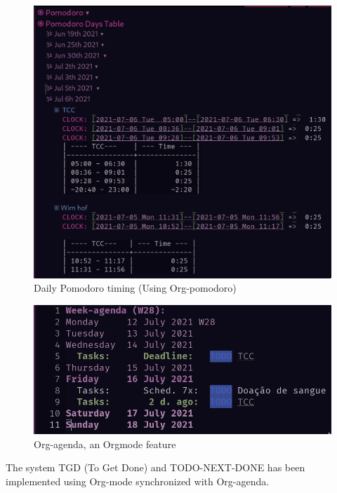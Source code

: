\documentclass[
12pt,				%
openright,			%
oneside,			%
a4paper,			%
brazil,				%
english,			%
]{abntex2}
\begin{document}

\begin{figure}[ht]
  \centering
  \caption{\label{fig:org-pomodoro} Daily Pomodoro timing (Using Org-pomodoro)}
  \includegraphics[width=0.4\linewidth]{Imagens/daily-pomodoro.png}
\end{figure}

\begin{figure}[ht]
  \centering
  \caption{\label{fig:org-agenda} Org-agenda, an Orgmode feature}
  \includegraphics[width=0.7\linewidth]{Imagens/weekly-agenda.png}
\end{figure}

The system TGD (To Get Done) and TODO-NEXT-DONE has been implemented
using Org-mode synchronized with Org-agenda.


\end{document}
